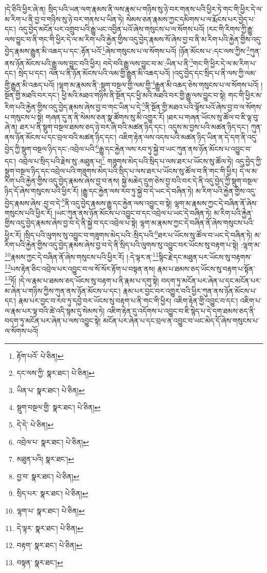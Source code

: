 །དེ་ཅིའི་ཕྱིར་ཞེ་ན། སྲིད་པའི་ཡན་ལག་རྣམས་ནི་ལས་རྣམ་པ་གཉིས་སུ་ཉེ་བར་གནས་པའི་ཕྱིར་ཏེ་གང་གི་ཕྱིར་དེ་ལ་མ་རིག་པ་ནི་བྱ་བ་གཉིས་སུ་ཉེ་བར་གནས་པ་ཡིན་ཏེ། སེམས་ཅན་རྣམས་ཀྱང་དམིགས་པ་ལ་རྨོངས་པར་བྱེད་པ་དང་། འདུ་བྱེད་མངོན་པར་འགྲུབ་པའི་རྒྱུ་ཡང་འབྱིན་པའོ་ཞེས་གསུངས་པ་ལ་སོགས་པའོ། །རང་གི་རིགས་ཀྱི་རྒྱུ་ལས་བྱུང་བ་ནི་གང་གི་ཕྱིར་དེ་ལ་མ་རིག་པའི་རྐྱེན་གྱིས་འདུ་བྱེད་རྣམས་སོ་ཞེས་བྱ་བ་ནི་མ་རིག་པའི་རྐྱེན་གྱིས་འདུ་བྱེད་རྣམས་རྒྱུན་མི་འཆད་པ་དང་:རྟོན་པའོ་\footnote{རྟོག་པའོ་  པེ་ཅིན། }ཞེས་གསུངས་པ་ལ་སོགས་པའོ། །ཉོན་མོངས་པ་:དང་ལས་ཀྱིས་\footnote{དང་ལས་ཀྱི་  སྣར་ཐང་།  པེ་ཅིན། }ཀུན་ནས་ཉོན་མོངས་པའི་རྒྱུ་ལས་བྱུང་བའི་ཕྱིར། བདེ་བའི་རྒྱུ་ལས་བྱུང་བ་མ་:ཡིན་པ་ནི་\footnote{ཡིན་པ་  སྣར་ཐང་།  པེ་ཅིན། }གང་གི་ཕྱིར་དེ་ལ་མ་རིག་པ་དང་། སྲེད་པ་དང་། ལེན་པ་ནི་ཉོན་མོངས་པའི་ལམ་གྱི་རྒྱུན་མི་འཆད་པའོ། །འདུ་བྱེད་དང་སྲིད་པ་ནི་ལས་ཀྱི་ལམ་གྱི་རྒྱུན་མི་འཆད་པའོ། །ལྷག་མ་རྣམས་ནི་:སྡུག་བསྔལ་གྱི་ལམ་གྱི་\footnote{སྡུག་བསྔལ་གྱི་  སྣར་ཐང་།  པེ་ཅིན། }རྒྱུན་མི་འཆད་ཅེས་གསུངས་པ་ལ་སོགས་པའོ། །སྔོན་གྱི་མཐའི་བར་དང་། ཕྱི་མའི་མཐའ་གཉིས་ནི་སྔོན་དང་ཕྱི་མའི་མཐའི་བར་གྱི་རྒྱུ་ལས་བྱུང་བ་སྟེ། གང་གི་ཕྱིར་མ་རིག་པའི་རྐྱེན་གྱིས་འདུ་བྱེད་རྣམས་ཞེས་བྱ་བ་གང་ཡིན་པ་དེ་\footnote{དེ་དེ་  པེ་ཅིན། }ནི་སྔོན་གྱི་མཐའ་པའི་ལྟོས་པའོ་ཞེས་བྱ་བ་ལ་སོགས་པ་གསུངས་པ་སྟེ། གཞན་དུ་ན་ནི་སེམས་ཅན་སྣ་ཚོགས་སུ་མི་འགྱུར་རོ། །ཐར་པ་གཞན་ཡོངས་སུ་ཚོལ་བ་ཇི་ལྟ་བུ་ཞེ་ན། ཐར་པ་ནི་སྡུག་བསྔལ་ཐམས་ཅད་ཉེ་བར་ཞི་བའི་མཚན་ཉིད་དང་། འདུས་མ་བྱས་པའི་མཚན་ཉིད་དང་། ཀུན་ནས་ཉོན་མོངས་པ་དང་བྲལ་བའི་མཚན་ཉིད་དང་། འཇིག་རྟེན་ལས་འདས་པའི་མཚན་ཉིད་ཡིན་ན་དེ་དག་ནི་འདུ་བྱེད་ཀྱི་སྡུག་བསྔལ་ཉིད་དང་:འབྲེལ་པའི་\footnote{འབྲེལ་པ་  སྣར་ཐང་།  པེ་ཅིན། }རྒྱུ་དང་རྐྱེན་ལས་རབ་ཏུ་སྐྱེ་བ་ཡང་ཀུན་ནས་ཉོན་མོངས་པ་འབྱུང་བ་དང་། འབྲེལ་པ་སྲིད་པའི་རྗེས་སུ་:མཐུན་པ།\footnote{མཐུན་པའི།  སྣར་ཐང་། } གཟུགས་མེད་པའི་སྲིད་པ་ལས་ཐར་པ་ཡོངས་སུ་ཚོལ་ཏེ། འདུ་བྱེད་ཀྱི་སྡུག་བསྔལ་ཉིད་དང་འབྲེལ་པའི་གཟུགས་མེད་པའི་སྲིད་པ་ལས་ཐར་པ་ཡོངས་སུ་ཚོལ་བ་ནི་གང་གི་ཕྱིར། དེ་ལ་མ་རིག་པའི་རྐྱེན་གྱིས་འདུ་བྱེད་རྣམས་ཞེས་བྱ་བ་ནས། སྐྱེ་མཆེད་དྲུག་ཅེས་བྱ་བའི་བར་དེ་ནི་འདུ་བྱེད་ཀྱི་སྡུག་བསྔལ་ཉིད་དོ་ཞེས་གསུངས་པའི་ཕྱིར་རོ། །རྒྱུ་དང་རྐྱེན་ལས་རབ་ཏུ་སྐྱེ་བ་དེ་ཡང་དེ་བཞིན་ཏེ། མ་རིག་པའི་རྐྱེན་གྱིས་འདུ་བྱེད་རྣམས་ཞེས་:བྱ་བ་དེ་\footnote{བྱ་བ་  སྣར་ཐང་།  པེ་ཅིན། }ནི་འདུ་བྱེད་རྣམས་རྒྱུ་དང་རྐྱེན་ལས་འབྱུང་བ་སྟེ། ལྷག་མ་རྣམས་ཀྱང་དེ་བཞིན་ནོ་ཞེས་གསུངས་པའི་ཕྱིར་རོ། །ཡང་ཀུན་ནས་ཉོན་མོངས་པ་འབྱུང་བ་དང་འབྲེལ་པ་ཡང་དེ་བཞིན་ཏེ། མ་རིག་པའི་རྐྱེན་གྱིས་འདུ་བྱེད་རྣམས་ཞེས་བྱ་བ་དེ་ནི་སྐྱེ་བ་དང་འབྲེལ་པ་སྟེ། ལྷག་མ་རྣམས་ཀྱང་དེ་བཞིན་ནོ་ཞེས་གསུངས་པའི་ཕྱིར་རོ། །སྲིད་པའི་ལུགས་སུ་འབྱུང་བ་གཟུགས་མེད་པའི་:སྲིད་པའི་\footnote{སྲིད་པར་  སྣར་ཐང་།  པེ་ཅིན། }ཐར་པ་ཡོངས་སུ་ཚོལ་བ་ཡང་དེ་བཞིན་ཏེ། མ་རིག་པའི་རྐྱེན་གྱིས་འདུ་བྱེད་རྣམས་ཞེས་བྱ་བ་དེ་ནི་སྲིད་པའི་ལུགས་སུ་འབྱུང་བར་ཡོངས་སུ་བརྟག་པ་སྟེ། :ལྷག་མ་\footnote{ལྷག་པ་  སྣར་ཐང་།  པེ་ཅིན། }རྣམས་ཀྱང་དེ་བཞིན་ནོ་ཞེས་གསུངས་པའི་ཕྱིར་རོ། །:དེ་ལྟར་ན་\footnote{དེ་ལྟར་  སྣར་ཐང་།  པེ་ཅིན། }སྙིང་རྗེ་དང་མཐུན་པར་ཡོངས་སུ་བརྟགས་\footnote{བརྟག་  སྣར་ཐང་།  པེ་ཅིན། }པས་རྟེན་ཅིང་འབྲེལ་པར་འབྱུང་བ་ལ་སོ་སོར་རྟོག་པ་བསྟན་ནས། རྣམ་པ་ཐམས་ཅད་ཡོངས་སུ་བརྟག་པ་སྟོན་\footnote{བསྟན་  སྣར་ཐང་། }ཏོ། །དེ་ལ་རྣམ་པ་ཐམས་ཅད་ཡོངས་སུ་བརྟག་པ་ནི་རྣམ་པ་དགུ་སྟེ། བདག་ཏུ་མངོན་པར་ཞེན་པ་དང་མངོན་པར་མ་ཞེན་པ་གཉིས་ཀྱིས་ཀུན་ནས་ཉོན་མོངས་པ་དང་། རྣམ་པར་བྱང་བར་འགྱུར་བའི་ཕྱིར་ཀུན་ནས་ཉོན་མོངས་པ་དང་། རྣམ་པར་བྱང་བ་རབ་ཏུ་དབྱེ་བར་ཡོངས་སུ་བརྟག་པ་ནི་གང་གི་ཕྱིར། འཇིག་རྟེན་གྱི་འབྱུང་བ་དང་། འཇིག་པ་ལ་རྣམ་པར་ལྟ་བའི་ཚེ་འདི་སྙམ་དུ་སེམས་ཏེ། འཇིག་རྟེན་དུ་འདོགས་པ་འབྱུང་བ་ཇི་སྙེད་པ་དེ་དག་ཐམས་ཅད་ནི་བདག་ཏུ་མངོན་པར་ཞེན་པ་ལས་འབྱུང་སྟེ། མངོན་པར་ཞེན་པ་དང་བྲལ་ན་འབྱུང་བ་ཡང་མེད་དོ་ཞེས་གསུངས་པ་ལ་སོགས་པའོ། 